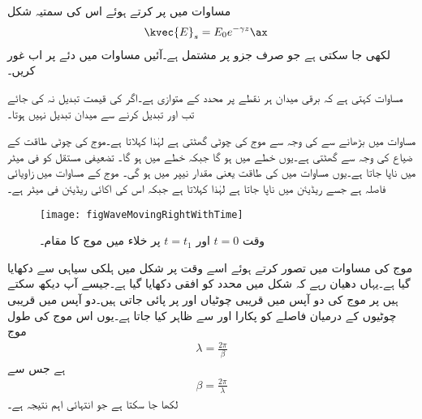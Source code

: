 مساوات  میں  پر کرتے ہوئے اس کی سمتیہ شکل  
\begin{align}\label{مساوات_موج_مثبت_زیڈ_جانب_سمتی}
\kvec{E}_s&=E_0 e^{-\gamma z} \ax
\end{align}
لکھی جا سکتی ہے جو صرف  جزو پر مشتمل ہے۔آئیں مساوات  میں دئے   پر اب غور کریں۔

مساوات  کہتی ہے کہ برقی میدان ہر نقطے پر  محدد کے متوازی ہے۔اگر  کی قیمت تبدیل نہ کی جائے تب  اور  تبدیل کرنے سے میدان تبدیل نہیں ہوتا۔

مساوات  میں  بڑھانے سے  کی وجہ سے موج کی چوٹی گھٹتی ہے لہٰذا   کہلاتا ہے۔موج کی چوٹی طاقت کے ضیاع کی وجہ سے گھٹتی ہے۔یوں  خطے میں  ہو گا جبکہ  خطے میں  ہو گا۔ تضعیفی مستقل کو  فی میٹر  میں ناپا جاتا ہے۔یوں مساوات  میں  کی طاقت یعنی   مقدار  نیپر  میں ہو گی۔ موج کے مساوات میں  زاویائی فاصلہ ہے جسے ریڈیئن میں ناپا جاتا ہے  لہٰذا   کہلاتا ہے جبکہ اس کی اکائی ریڈیئن فی
 میٹر  ہے۔  

\begin{figure}
\centering
\texttt{[image: figWaveMovingRightWithTime]}
\caption{وقت $t=0$ اور $t=t_1$ پر خلاء میں موج کا مقام۔}
\label{شکل_موج_وقت_کے_ساتھ_مثبت_چلتی_موج}
\end{figure}


موج کی مساوات  میں  تصور کرتے ہوئے اسے وقت  پر شکل  میں ہلکی سیاہی سے دکھایا گیا ہے۔یہاں دھیان رہے کہ شکل میں  محدد کو افقی دکھایا گیا ہے۔جیسے آپ دیکھ سکتے ہیں  پر موج کی دو آپس میں قریبی چوٹیاں  اور  پر پائی جاتی ہیں۔دو آپس میں قریبی چوٹیوں کے درمیان فاصلے کو  پکارا اور  سے ظاہر کیا جاتا ہے۔یوں اس موج کی طول موج
\begin{align}\label{مساوات_موج_زاویائی_مستقل_اور_طول_موج_الف}
\lambda=\frac{2\pi}{\beta}
\end{align}
ہے جس سے
\begin{align}\label{مساوات_موج_زاویائی_مستقل_اور_طول_موج_ب}
\beta=\frac{2\pi}{\lambda}
\end{align}
لکھا جا سکتا ہے جو انتہائی اہم نتیجہ ہے۔

